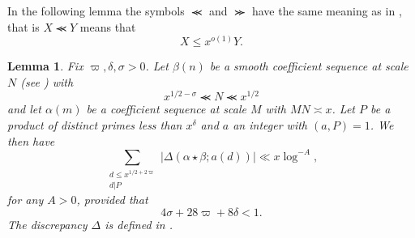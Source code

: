 \documentclass[12pt]{amsart}
\theoremstyle{plain}
\newtheorem{lem}{Lemma}
\theoremstyle{definition}
\numberwithin{equation}{section}
\def \a{\alpha} \def \b{\beta} \def \d{\delta} \def \e{\varepsilon} \def \g{\gamma} \def \k{\kappa} \def \l{\lambda} \def \s{\sigma} \def \t{\theta} \def \z{\zeta}
\newcommand{\twosum}[2]{\sum_{\substack{#1\\#2}}}
\renewcommand{\lessapprox}{\llcurly}
\renewcommand{\gtrapprox}{\ggcurly}
\begin{document}
In the following lemma the symbols $\lessapprox$ and $\gtrapprox$ have  the same meaning as in \cite{polymath8a}, that is $X\lessapprox Y$ means that 
$$X\leq x^{o(1)}Y.$$

 \begin{lem}\label{lem1}
Fix $\varpi,\delta,\sigma>0$.  Let $\b(n)$ be a smooth coefficient sequence at scale $N$ (see \cite[Definition 2.5]{polymath8a}) with 
\begin{equation}\label{lem1cond1}
x^{1/2-\sigma}\lessapprox N\lessapprox x^{1/2}
\end{equation}
and let $\a(m)$ be a coefficient sequence at scale $M$ with $MN\asymp x$.  Let $P$ be a product of distinct primes less than $x^\d$ and $a$ an integer with $(a,P)=1$.  We then have 
$$\twosum{d\leq x^{1/2+2\varpi}}{d|P}|\Delta(\a\star\b;a(d))|\ll x\log^{-A},$$
for any $A>0$, provided that 
\begin{equation}\label{lem1cond2}
4\sigma+28\varpi+8\delta<1.
\end{equation}
The discrepancy $\Delta$ is defined in \cite[(1.1)]{polymath8a}.  
\end{lem}
 
\end{document}
